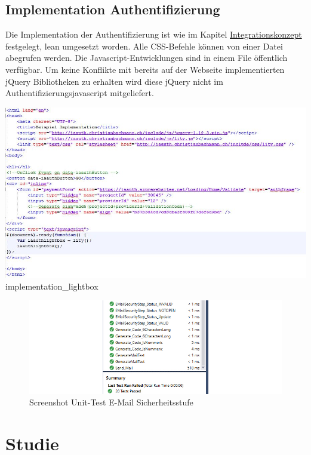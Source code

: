 \section{Implementation
Authentifizierung}\label{implementation-authentifizierung}

Die Implementation der Authentifizierung ist wie im Kapitel
\protect\hyperlink{integrationskonzept}{Integrationskonzept} festgelegt,
lean umgesetzt worden. Alle CSS-Befehle können von einer Datei abegrufen
werden. Die Javascript-Entwicklungen sind in einem File öffentlich
verfügbar. Um keine Konflikte mit bereits auf der Webseite
implementierten jQuery Bibliotheken zu erhalten wird diese jQuery nicht
im Authentifizierungsjavascript mitgeliefert.

\includegraphics{images/code/implementation_lightbox.jpg}
implementation\_lightbox

\begin{figure}[htbp]
\centering
\includegraphics{images/screenshot_test.jpg}
\caption{Screenshot Unit-Test E-Mail Sicherheitsstufe}
\end{figure}

\newpage

\chapter{Studie}\label{studie}

